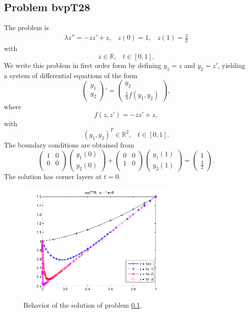 \documentclass[<options>]{article}
\def \RR {{\mathbb{R}}}
\begin{document}
\subsection{Problem bvpT28}\label{test28}
The problem is 
\begin{eqnarray*}
\lambda z'' = - z z' +  z , \;\;\;z(0) =1, \;\;\; z(1) = \frac{3}{2}
\end{eqnarray*}
with
\[
z \in \RR, \;\;\; t\in [0,1].
\]
We write this problem in first order form by defining $y_1=z$ and $y_2=z'$, yielding a system of differential equations of the form
\begin{equation*}
\left(\begin{array}{c}
y_1\\
y_2
\end{array}\right)'=
\left(\begin{array}{c}
y_2\\
\frac{1}{\lambda}f(y_1,y_2)
\end{array}\right),
\end{equation*}
where
\begin{equation*}
 f(z,z') = - z z' +  z,
\end{equation*}
with
\[
(y_1,y_2)^T \in \RR^{2}, \;\;\;  t \in [0,1].
\]
The  boundary conditions are obtained from
\begin{equation*}
\left(
  \begin{array}{cc}
    1 & 0 \\
    0 & 0 \\
  \end{array}
\right)
\left(\begin{array}{c}
y_{1}(0)\\
y_{2}(0)
\end{array}\right)
+
\left(
  \begin{array}{cc}
    0 & 0 \\
    1 & 0 \\
  \end{array}
\right)
\left(\begin{array}{c}
y_{1}(1)\\
y_{2}(1)
\end{array}\right)=\left(\begin{array}{c}
1 \\
\frac{3}{2}
\end{array}\right).
\end{equation*}
The solution has corner layers at $t= 0.$

\begin{figure}[htb]
\centerline{\includegraphics[height=6cm]{Prob28}}
\caption{Behavior of the solution of problem \ref{test28}.}
\end{figure}
\newpage
\end{document}
